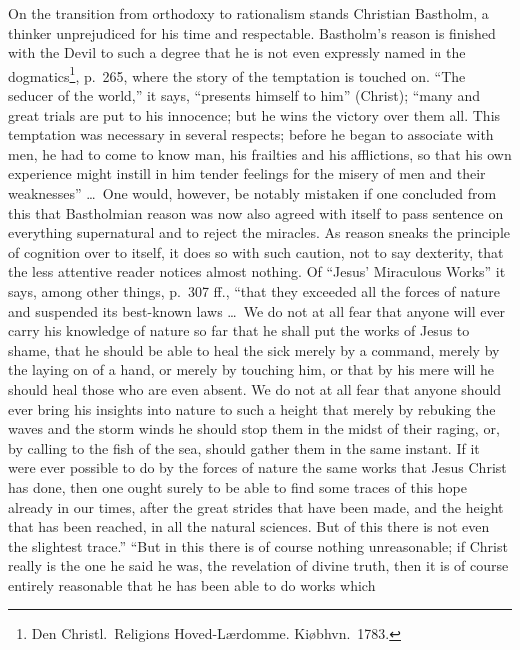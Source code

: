 \documentclass[12pt,a4paper]{article}
\newcommand{\opage}[1]{\marginnote{\footnotesize\textit{[#1]}}}
\begin{document}
On the transition from orthodoxy to rationalism stands Christian Bastholm, a
thinker unprejudiced for his time and respectable. Bastholm's reason is
finished with the Devil to such a degree that he is not even expressly
named in the dogmatics\footnote{Den Christl.\ Religions Hoved-Lærdomme. Kiøbhvn.\ 1783.}, %
p.\ 265, where the story of the temptation is touched on. ``The seducer of
the world,'' it says, ``presents himself to him'' (Christ); ``many and great
trials are put to his innocence; but he wins the victory over them all. This
temptation was necessary in several respects; before he began to associate
with men, he had to come to know man, his frailties and his afflictions, so
that his own experience might instill in him tender feelings for the misery
of men and their weaknesses'' \ldots\ One would, however, be notably
mistaken if one concluded from this that Bastholmian reason was now also
agreed with itself to pass sentence on everything supernatural and to reject
the miracles. As
\opage{27}reason sneaks the principle of cognition over to itself, it does so with
such caution, not to say dexterity, that the less attentive reader notices
almost nothing. Of ``Jesus' Miraculous Works'' it says, among other things,
p.\ 307 ff., ``that they exceeded all the forces of nature and suspended its
best-known laws \ldots\ We do not at all fear that anyone will ever carry
his knowledge of nature so far that he shall put the works of Jesus to
shame, that he should be able to heal the sick merely by a command, merely
by the laying on of a hand, or merely by touching him, or that by his mere
will he should heal those who are even absent. We do not at all fear that
anyone should ever bring his insights into nature to such a height that
merely by rebuking the waves and the storm winds he should stop them in the
midst of their raging, or, by calling to the fish of the sea, should gather
them in the same instant. If it were ever possible to do by the forces of
nature the same works that Jesus Christ has done, then one ought surely to
be able to find some traces of this hope already in our times, after the
great strides that have been made, and the height that has been reached, in
all the natural sciences. But of this there is not even the slightest
trace.'' ``But in this there is of course nothing unreasonable; if Christ
really is the one he said he was, the revelation of divine truth, then it is
of course entirely reasonable that he has been able to do works which
\end{document}

